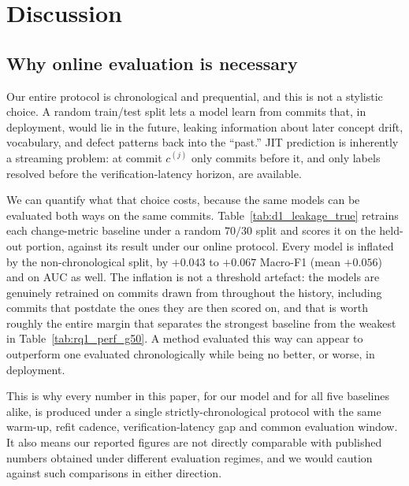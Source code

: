 \documentclass[final,5p,times,twocolumn]{elsarticle}
\theoremstyle{plain}
\begin{document}
\FloatBarrier


\section{Discussion}
\label{sec:discuss}

\subsection{Why online evaluation is necessary}
\label{sec:discuss_online}
Our entire protocol is chronological and prequential, and this is not a stylistic
choice. A random train/test split lets a model learn from commits that, in
deployment, would lie in the future, leaking information about later concept drift,
vocabulary, and defect patterns back into the ``past.'' JIT prediction is inherently
a streaming problem: at commit $c^{(j)}$ only commits before it, and only labels
resolved before the verification-latency horizon, are available.

We can quantify what that choice costs, because the same models can be evaluated both
ways on the same commits. Table~\ref{tab:d1_leakage_true} retrains each change-metric
baseline under a random $70/30$ split and scores it on the held-out portion, against
its result under our online protocol. Every model is inflated by the
non-chronological split, by $+0.043$ to $+0.067$ Macro-F1 (mean $+0.056$) and on AUC
as well. The inflation is not a threshold artefact: the models are genuinely retrained
on commits drawn from throughout the history, including commits that postdate the ones
they are then scored on, and that is worth roughly the entire margin that separates the
strongest baseline from the weakest in Table~\ref{tab:rq1_perf_g50}. A method evaluated
this way can appear to outperform one evaluated chronologically while being no better,
or worse, in deployment.

This is why every number in this paper, for our model and for all five baselines
alike, is produced under a single strictly-chronological protocol with the same
warm-up, refit cadence, verification-latency gap and common evaluation window. It also
means our reported figures are not directly comparable with published numbers obtained
under different evaluation regimes, and we would caution against such comparisons in
either direction.
\end{document}
